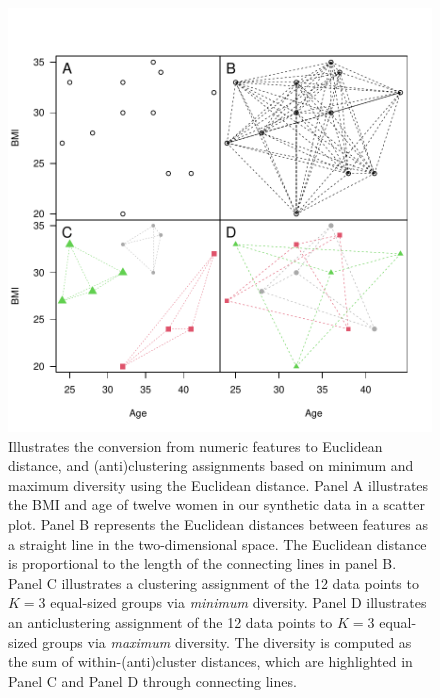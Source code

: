 \documentclass[
]{article}
\begin{document}
\begin{figure}

{\centering \includegraphics{supplementary_materials_files/figure-latex/unnamed-chunk-2-1} 

}

\caption{Illustrates the conversion from numeric features to Euclidean distance, and (anti)clustering assignments based on minimum and maximum diversity using the Euclidean distance. Panel A illustrates the BMI and age of twelve women in our synthetic data in a scatter plot. Panel B represents the Euclidean distances between features as a straight line in the two-dimensional space. The Euclidean distance is proportional to the length of the connecting lines in panel B. Panel C illustrates a clustering assignment of the 12 data points to $K = 3$ equal-sized groups via \textit{minimum} diversity. Panel D illustrates an anticlustering assignment of the 12 data points to $K = 3$ equal-sized groups via \textit{maximum} diversity. The diversity is computed as the sum of within-(anti)cluster distances, which are highlighted in Panel C and Panel D through connecting lines.}\label{fig:unnamed-chunk-2}
\end{figure}
\end{document}
